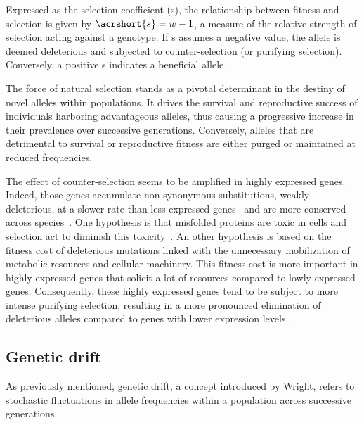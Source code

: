 Expressed as the selection coefficient (\acrshort{s}), the relationship between fitness and selection is given by $\acrshort{s} = w - 1$, a measure of the relative strength of selection acting against a genotype. If \acrshort{s} assumes a negative value, the allele is deemed deleterious and subjected to counter-selection (or purifying selection). Conversely, a positive \acrshort{s} indicates a beneficial \gls{allele}~\citep{redei_selection_2008, coop_population_2020, akashi_within-_1999}.

The force of natural selection stands as a pivotal determinant in the destiny of novel \gls{allele}s within populations. It drives the survival and reproductive success of individuals harboring advantageous \gls{allele}s, thus causing a progressive increase in their prevalence over successive generations. Conversely, \gls{allele}s that are detrimental to survival or reproductive fitness are either purged or maintained at reduced frequencies. 

The effect of counter-selection seems to be amplified in highly expressed genes. Indeed, those genes accumulate \gls{non-synonymous} substitutions, weakly deleterious, at a slower rate than less expressed genes~\citep{duret_determinants_2000, rocha_analysis_2004, pagan_level_2012, brion_evolution_2015} and are more conserved across species~\citep{pal_highly_2001, geiler-samerotte_misfolded_2011, zhang_determinants_2015}. One hypothesis is that misfolded proteins are toxic in cells and selection act to diminish this toxicity~\citep{yang_protein_2012, park_differential_2013, wu_expression_2022, trucchi_gene_2023}. An other hypothesis is based on the fitness cost of deleterious mutations linked with the unnecessary mobilization of metabolic resources and cellular machinery. This fitness cost is more important in highly expressed genes that solicit a lot of resources compared to lowly expressed genes. Consequently, these highly expressed genes tend to be subject to more intense purifying selection, resulting in a more pronounced elimination of deleterious alleles compared to genes with lower expression levels~\citep{saudemont_fitness_2017, nabholz_high_2012}.


\subsection{Genetic drift}
\label{geneticdrift}

As previously mentioned, \gls{genetic drift}, a concept introduced by Wright, refers to stochastic fluctuations in allele frequencies within a population across successive generations. 

